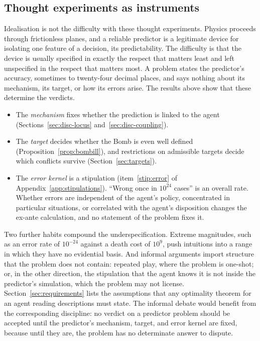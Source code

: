 \subsection{Thought experiments as instruments}\label{sec:disc-thought}

Idealisation is not the difficulty with these thought experiments. Physics proceeds through
frictionless planes, and a reliable predictor is a legitimate device for isolating one feature of a
decision, its predictability. The difficulty is that the device is usually specified in exactly the
respect that matters least and left unspecified in the respect that matters most. A problem states
the predictor's accuracy, sometimes to twenty-four decimal places, and says nothing about its
mechanism, its target, or how its errors arise. The results above show that these determine the
verdicts.
\begin{itemize}
  \item The \emph{mechanism} fixes whether the prediction is linked to the agent
        (Sections~\ref{sec:disc-locus} and~\ref{sec:disc-coupling}).
  \item The \emph{target} decides whether the Bomb is even well defined
        (Proposition~\ref{prop:bombill}), and restrictions on admissible targets decide which
        conflicts survive (Section~\ref{sec:targets}).
  \item The \emph{error kernel} is a stipulation (item~\ref{stip:error} of
        Appendix~\ref{app:stipulations}). \enquote{Wrong once in $10^{24}$ cases} is an overall rate.
        Whether errors are independent of the agent's policy, concentrated in particular situations,
        or correlated with the agent's disposition changes the ex-ante calculation, and no statement
        of the problem fixes it.
\end{itemize}

Two further habits compound the underspecification. Extreme magnitudes, such as an error rate of
$10^{-24}$ against a death cost of $10^{9}$, push intuitions into a range in which they have no
evidential basis. And informal arguments import structure that the problem does not contain: repeated
play, where the problem is one-shot; or, in the other direction, the stipulation that the agent knows
it is not inside the predictor's simulation, which the problem may not license.
Section~\ref{sec:requirements} lists the assumptions that any optimality theorem for an agent reading
descriptions must state. The informal debate would benefit from the corresponding discipline: no
verdict on a predictor problem should be accepted until the predictor's mechanism, target, and error
kernel are fixed, because until they are, the problem has no determinate answer to dispute.

